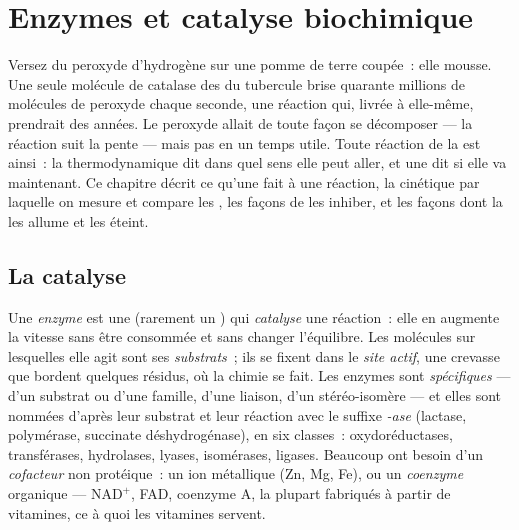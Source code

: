 \chapter{Enzymes et catalyse biochimique}\label{ch:b1:enzymes}

Versez du peroxyde d'hydrogène sur une pomme de terre coupée~: elle
mousse. Une seule molécule de catalase des  du tubercule brise
quarante millions de molécules de peroxyde chaque seconde, une réaction
qui, livrée à elle-même, prendrait des années. Le peroxyde allait de
toute façon se décomposer --- la réaction suit la pente --- mais pas en
un temps utile. Toute réaction de la  est ainsi~: la
thermodynamique dit dans quel sens elle peut aller, et une
\emph{} dit si elle va maintenant. Ce chapitre décrit ce qu'une
 fait à une réaction, la cinétique par laquelle on mesure et
compare les , les façons de les inhiber, et les façons dont la
 les allume et les éteint.

\section{La catalyse}

\begin{definition}\label{def:b1:enzymes:enzyme}
Une \emph{enzyme} est une  (rarement un ) qui
\emph{catalyse} une réaction~: elle en augmente la vitesse sans être
consommée et sans changer l'équilibre. Les molécules sur lesquelles elle
agit sont ses \emph{substrats}~; ils se fixent dans le
\emph{site actif}, une crevasse que bordent quelques
résidus, où la chimie se fait. Les enzymes sont \emph{spécifiques} ---
d'un substrat ou d'une famille, d'une liaison, d'un stéréo-isomère ---
et elles sont nommées d'après leur substrat et leur réaction avec le
suffixe \emph{-ase} (lactase,  polymérase, succinate déshydrogénase),
en six classes~: oxydoréductases, transférases, hydrolases, lyases,
isomérases, ligases. Beaucoup ont besoin d'un \emph{cofacteur}
non protéique~: un ion métallique (Zn, Mg, Fe), ou un
\emph{coenzyme} organique --- $\mathrm{NAD^+}$, FAD,
coenzyme A, la plupart fabriqués à partir de vitamines, ce à quoi les
vitamines servent.
\end{definition}

